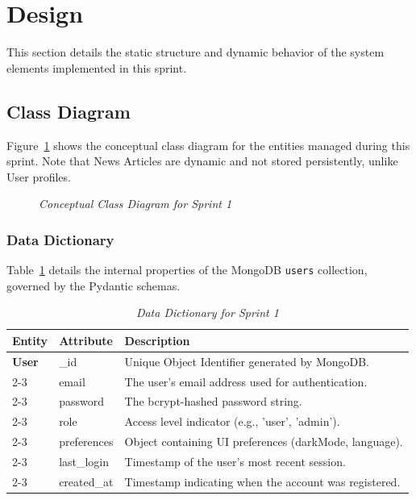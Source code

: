 \section{Design}
This section details the static structure and dynamic behavior of the system elements implemented in this sprint.

\subsection{Class Diagram}
Figure~\ref{fig:sprint1_class} shows the conceptual class diagram for the entities managed during this sprint. Note that News Articles are dynamic and not stored persistently, unlike User profiles.

\begin{figure}[H]
    \centering
    \caption{\textit{Conceptual Class Diagram for Sprint 1}}
    \label{fig:sprint1_class}
\end{figure}

\subsubsection{Data Dictionary}
Table~\ref{tab:sprint1_dict} details the internal properties of the MongoDB \texttt{users} collection, governed by the Pydantic schemas.

\begin{table}[H]
\centering
\small
\renewcommand{\arraystretch}{1.5}
\begin{tabular}{|p{2.5cm}|p{3.5cm}|p{8.5cm}|}
\hline
\rowcolor[HTML]{1F3864}
{\color{white}\textbf{Entity}} & {\color{white}\textbf{Attribute}} & {\color{white}\textbf{Description}} \\
\hline
\textbf{User} & \_id & Unique Object Identifier generated by MongoDB. \\
\cline{2-3}
& email & The user's email address used for authentication. \\
\cline{2-3}
& password & The bcrypt-hashed password string. \\
\cline{2-3}
& role & Access level indicator (e.g., 'user', 'admin'). \\
\cline{2-3}
& preferences & Object containing UI preferences (darkMode, language). \\
\cline{2-3}
& last\_login & Timestamp of the user's most recent session. \\
\cline{2-3}
& created\_at & Timestamp indicating when the account was registered. \\
\hline
\end{tabular}
\caption{\textit{Data Dictionary for Sprint 1}}
\label{tab:sprint1_dict}
\end{table}

